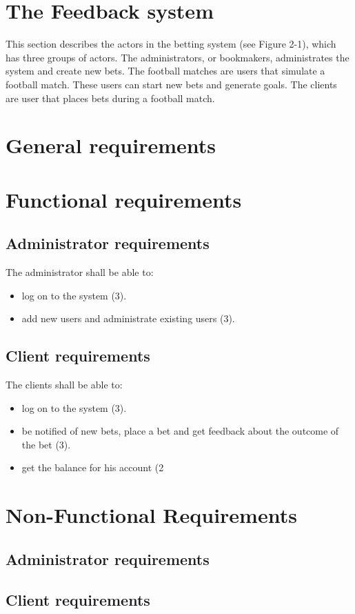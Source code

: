 \section{ The Feedback system}

This section describes the actors in the betting system (see Figure 2-1), which has three groups of actors. The administrators, or bookmakers, administrates the system and create new bets. The football matches are users that simulate a football match. These users can start new bets and generate goals. The clients are user that places bets during a football match.


\section{ General requirements}

\section{Functional requirements}

\subsection{Administrator requirements}

The administrator shall be able to:

\begin{itemize}

\item \textbf{} log on to the system (3).

\item \textbf{}  add new users and administrate existing users (3).

\end{itemize}

\subsection{Client requirements}

The clients shall be able to:
\begin{itemize}
\item \textbf{} log on to the system (3).
\item \textbf{} be notified of new bets, place a bet and get feedback about the outcome of the bet (3).
\item \textbf{}  get the balance for his account (2

\end{itemize}

\section{Non-Functional Requirements}

\subsection{Administrator requirements}

\subsection{Client requirements}
